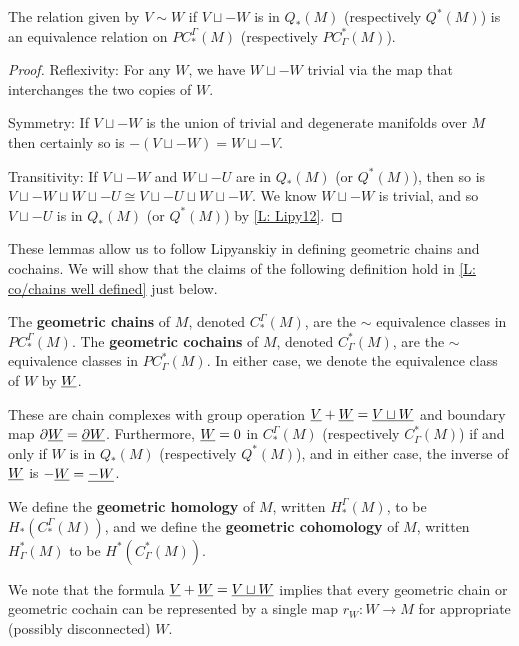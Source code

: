 \begin{lemma}\label{L: cancel Q}
	The relation given by $V\sim W$ if $V \sqcup -W$ is in $Q_*(M)$ (respectively $Q^*(M)$) is an equivalence relation on $PC^\Gamma_*(M)$ (respectively $PC_\Gamma^*(M)$).
\end{lemma}

\begin{proof}
	Reflexivity: For any $W$, we have $W \sqcup -W$ trivial via the map that interchanges the two copies of $W$.

	Symmetry: If $V \sqcup -W$ is the union of trivial and degenerate manifolds over $M$ then certainly so is $-(V \sqcup -W) = W \sqcup -V$.

	Transitivity: If $V \sqcup -W$ and $W \sqcup -U$ are in $Q_*(M)$ (or $Q^*(M)$), then so is $V \sqcup -W \sqcup W \sqcup -U \cong V \sqcup -U \sqcup W \sqcup -W$.
	We know $W \sqcup -W$ is trivial, and so $V \sqcup -U$ is in $Q_*(M)$ (or $Q^*(M)$) by \cref{L: Lipy12}.
\end{proof}

These lemmas allow us to follow Lipyanskiy in defining geometric chains and cochains.
We will show that the claims of the following definition hold in \cref{L: co/chains well defined} just below.

\begin{definition}\label{D: chains and cochains}
	The \textbf{geometric chains} of $M$, denoted $C^\Gamma_*(M)$, are the $\sim$ equivalence classes in $PC^\Gamma_*(M)$.
	The \textbf{geometric cochains} of $M$, denoted $C_\Gamma^*(M)$, are the $\sim$ equivalence classes in $PC_\Gamma^*(M)$.
	In either case, we denote the equivalence class of $W$ by $\underline{W}$.

	These are chain complexes with group operation $\underline{V} + \underline{W} = \underline{V \sqcup W}$ and boundary map $\partial \underline{W} = \underline{\partial W}$.
	Furthermore, $\underline{W} = 0$ in $C^\Gamma_*(M)$ (respectively $C_\Gamma^*(M)$) if and only if $W$ is in $Q_*(M)$ (respectively $Q^*(M)$), and in either case, the inverse of $\underline{W}$ is $-\underline{W} = \underline{-W}$.

	We define the \textbf{geometric homology} of $M$, written $H_*^\Gamma(M)$, to be $H_*(C^\Gamma_*(M))$, and
	we define the \textbf{geometric cohomology} of $M$, written $H^*_\Gamma(M)$ to be $H^*(C_\Gamma^*(M))$.
\end{definition}

We note that the formula $\underline{V} + \underline{W} = \underline{V \sqcup W}$ implies that every geometric chain or geometric cochain can be represented by a single map $r_W \colon W \to M$ for appropriate (possibly disconnected) $W$.


